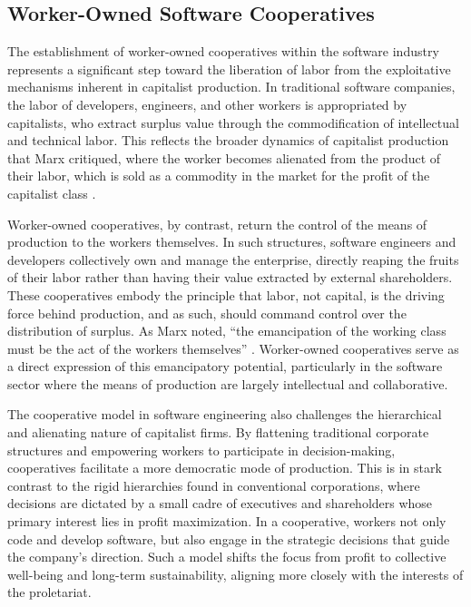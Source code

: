 \begin{refsection}
\section{Worker-Owned Software Cooperatives}

The establishment of worker-owned cooperatives within the software industry represents a significant step toward the liberation of labor from the exploitative mechanisms inherent in capitalist production. In traditional software companies, the labor of developers, engineers, and other workers is appropriated by capitalists, who extract surplus value through the commodification of intellectual and technical labor. This reflects the broader dynamics of capitalist production that Marx critiqued, where the worker becomes alienated from the product of their labor, which is sold as a commodity in the market for the profit of the capitalist class \cite[pp.~364-366]{marx1867}.

Worker-owned cooperatives, by contrast, return the control of the means of production to the workers themselves. In such structures, software engineers and developers collectively own and manage the enterprise, directly reaping the fruits of their labor rather than having their value extracted by external shareholders. These cooperatives embody the principle that labor, not capital, is the driving force behind production, and as such, should command control over the distribution of surplus. As Marx noted, “the emancipation of the working class must be the act of the workers themselves” \cite[pp.~132-133]{marx1871}. Worker-owned cooperatives serve as a direct expression of this emancipatory potential, particularly in the software sector where the means of production are largely intellectual and collaborative.

The cooperative model in software engineering also challenges the hierarchical and alienating nature of capitalist firms. By flattening traditional corporate structures and empowering workers to participate in decision-making, cooperatives facilitate a more democratic mode of production. This is in stark contrast to the rigid hierarchies found in conventional corporations, where decisions are dictated by a small cadre of executives and shareholders whose primary interest lies in profit maximization. In a cooperative, workers not only code and develop software, but also engage in the strategic decisions that guide the company’s direction. Such a model shifts the focus from profit to collective well-being and long-term sustainability, aligning more closely with the interests of the proletariat.


\end{refsection}
